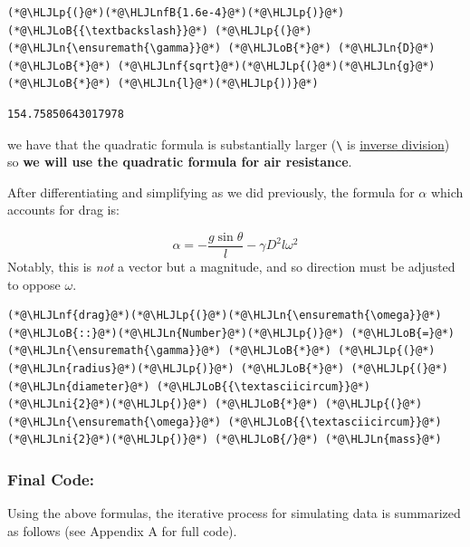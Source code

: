 \documentclass[12pt,a4paper]{article}
\newcommand{\HLJLn}[1]{#1}
\newcommand{\HLJLnf}[1]{\textcolor[RGB]{66,102,213}{#1}}
\newcommand{\HLJLnfB}[1]{\textcolor[RGB]{59,151,46}{#1}}
\newcommand{\HLJLni}[1]{\textcolor[RGB]{59,151,46}{#1}}
\newcommand{\HLJLoB}[1]{\textcolor[RGB]{102,102,102}{\textbf{#1}}}
\newcommand{\HLJLp}[1]{#1}
\begin{document}
\begin{lstlisting}
(*@\HLJLp{(}@*)(*@\HLJLnfB{1.6e-4}@*)(*@\HLJLp{)}@*) (*@\HLJLoB{{\textbackslash}}@*) (*@\HLJLp{(}@*)(*@\HLJLn{\ensuremath{\gamma}}@*) (*@\HLJLoB{*}@*) (*@\HLJLn{D}@*) (*@\HLJLoB{*}@*) (*@\HLJLnf{sqrt}@*)(*@\HLJLp{(}@*)(*@\HLJLn{g}@*) (*@\HLJLoB{*}@*) (*@\HLJLn{l}@*)(*@\HLJLp{))}@*)
\end{lstlisting}

\begin{lstlisting}
154.75850643017978
\end{lstlisting}


we have that the quadratic formula is substantially larger (\texttt{{\textbackslash}} is \href{https://docs.julialang.org/en/v1/manual/mathematical-operations/#Arithmetic-Operators}{inverse division}) so \textbf{we will use the quadratic formula for air resistance}.

After differentiating and simplifying as we did previously, the formula for \ensuremath{\alpha} which accounts for drag is:

\[
\alpha = -\frac{g\sin\theta}{l} - \gamma D^2 l \omega^2
\]
Notably, this is \emph{not} a vector but a magnitude, and so direction must be adjusted to oppose $\omega$.


\begin{lstlisting}
(*@\HLJLnf{drag}@*)(*@\HLJLp{(}@*)(*@\HLJLn{\ensuremath{\omega}}@*)(*@\HLJLoB{::}@*)(*@\HLJLn{Number}@*)(*@\HLJLp{)}@*) (*@\HLJLoB{=}@*) (*@\HLJLn{\ensuremath{\gamma}}@*) (*@\HLJLoB{*}@*) (*@\HLJLp{(}@*)(*@\HLJLn{radius}@*)(*@\HLJLp{)}@*) (*@\HLJLoB{*}@*) (*@\HLJLp{(}@*)(*@\HLJLn{diameter}@*) (*@\HLJLoB{{\textasciicircum}}@*) (*@\HLJLni{2}@*)(*@\HLJLp{)}@*) (*@\HLJLoB{*}@*) (*@\HLJLp{(}@*)(*@\HLJLn{\ensuremath{\omega}}@*) (*@\HLJLoB{{\textasciicircum}}@*) (*@\HLJLni{2}@*)(*@\HLJLp{)}@*) (*@\HLJLoB{/}@*) (*@\HLJLn{mass}@*)
\end{lstlisting}

\subsubsection{Final Code:}
Using the above formulas, the iterative process for simulating data is summarized as follows (see Appendix A for full code).
\end{document}
